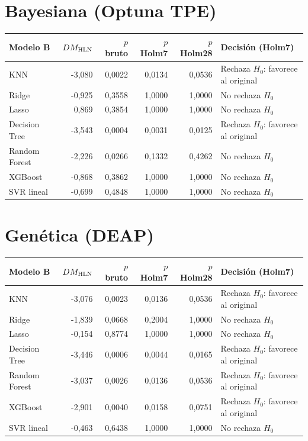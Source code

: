 \documentclass[11pt]{article}
\begin{document}
\section*{Bayesiana (Optuna TPE)}
\begin{center}\small\begin{tabular}{lrrrrl}\toprule
Modelo B & $DM_{\rm HLN}$ & $p$ bruto & $p$ Holm7 & $p$ Holm28 & Decisión (Holm7)\\\midrule
KNN & -3,080 & 0,0022 & 0,0134 & 0,0536 & Rechaza $H_0$: favorece al original\\
Ridge & -0,925 & 0,3558 & 1,0000 & 1,0000 & No rechaza $H_0$\\
Lasso & 0,869 & 0,3854 & 1,0000 & 1,0000 & No rechaza $H_0$\\
Decision Tree & -3,543 & 0,0004 & 0,0031 & 0,0125 & Rechaza $H_0$: favorece al original\\
Random Forest & -2,226 & 0,0266 & 0,1332 & 0,4262 & No rechaza $H_0$\\
XGBoost & -0,868 & 0,3862 & 1,0000 & 1,0000 & No rechaza $H_0$\\
SVR lineal & -0,699 & 0,4848 & 1,0000 & 1,0000 & No rechaza $H_0$\\
\bottomrule\end{tabular}\end{center}
\section*{Genética (DEAP)}
\begin{center}\small\begin{tabular}{lrrrrl}\toprule
Modelo B & $DM_{\rm HLN}$ & $p$ bruto & $p$ Holm7 & $p$ Holm28 & Decisión (Holm7)\\\midrule
KNN & -3,076 & 0,0023 & 0,0136 & 0,0536 & Rechaza $H_0$: favorece al original\\
Ridge & -1,839 & 0,0668 & 0,2004 & 1,0000 & No rechaza $H_0$\\
Lasso & -0,154 & 0,8774 & 1,0000 & 1,0000 & No rechaza $H_0$\\
Decision Tree & -3,446 & 0,0006 & 0,0044 & 0,0165 & Rechaza $H_0$: favorece al original\\
Random Forest & -3,037 & 0,0026 & 0,0136 & 0,0536 & Rechaza $H_0$: favorece al original\\
XGBoost & -2,901 & 0,0040 & 0,0158 & 0,0751 & Rechaza $H_0$: favorece al original\\
SVR lineal & -0,463 & 0,6438 & 1,0000 & 1,0000 & No rechaza $H_0$\\
\bottomrule\end{tabular}\end{center}
\end{document}
